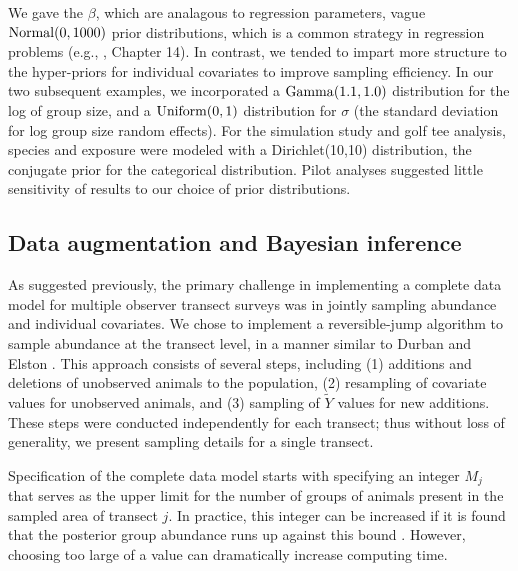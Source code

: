 \documentclass[10pt]{article}
\begin{document}
We gave the $\beta$, which are analagous to regression parameters, vague ${\rm Normal}(0,1000)$ prior distributions, which is a common strategy in regression problems (e.g., \cite{GelmanEtAl2004}, Chapter 14).  In contrast, we tended to impart more structure to the hyper-priors for individual covariates to improve sampling efficiency.  In our two subsequent examples, we incorporated a ${\rm Gamma}(1.1,1.0)$ distribution for the log of group size, and a ${\rm Uniform}(0,1)$ distribution for $\sigma$ (the standard deviation for log group size random effects). For the simulation study and golf tee analysis, species and exposure were modeled with a Dirichlet(10,10) distribution, the conjugate prior for the categorical distribution.  Pilot analyses suggested little sensitivity of results to our choice of prior distributions.

\subsection*{Data augmentation and Bayesian inference}

As suggested previously, the primary challenge in implementing a complete data model for multiple observer transect surveys was in jointly sampling abundance and individual covariates.  We chose to implement a reversible-jump algorithm to sample abundance at the transect level, in a manner similar to Durban and Elston \cite{DurbanElston2005}.  This approach consists of several steps, including (1) additions and deletions of unobserved animals to the population, (2) resampling of covariate values for unobserved animals, and (3) sampling of $\tilde{Y}$ values for new additions. These steps were conducted independently for each transect; thus without loss of generality, we present sampling details for a single transect.

Specification of the complete data model starts with specifying an integer $M_j$ that serves as the upper limit for the number of groups of animals present in the sampled area of transect $j$. In practice, this integer can be increased if it is found that the posterior group abundance runs up against this bound \cite{DurbanElston2005,RoyleEtAl2007b}. However, choosing too large of a value can dramatically increase computing time.
\end{document}
